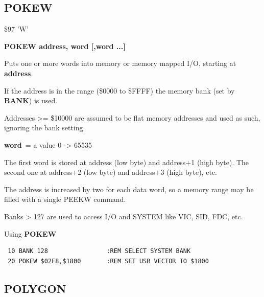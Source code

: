 \subsection{POKEW}
\begin{description}[leftmargin=2cm,style=nextline]
\item [Token:] \$97 'W'
\item [Format:] {\bf POKEW address, word [,word ...] }
\item [Usage:]  Puts one or more words into memory
                or memory mapped I/O, starting at
                {\bf address}.

                If the address is in the range (\$0000 to \$FFFF) the
                memory bank (set by {\bf BANK}) is used.

                Addresses >= \$10000 are assumed to be flat memory
                addresses and used as such, ignoring the bank setting.

                {\bf word} = a value 0 -> 65535

                The first word is stored at address (low byte)
                and address+1 (high byte). The second one at
                address+2 (low byte) and address+3 (high byte), etc.

\item [Remarks:] The address is increased by two for each data word,
                 so a memory range may be filled with a single PEEKW command.

                 Banks > 127 are used to access I/O and SYSTEM
                 like VIC, SID, FDC, etc.
\item [Example:] Using {\bf POKEW}

\begin{tcolorbox}[colback=black,coltext=white]
\verbatimfont{\codefont}
\begin{verbatim}
 10 BANK 128                :REM SELECT SYSTEM BANK
 20 POKEW $02F8,$1800       :REM SET USR VECTOR TO $1800
\end{verbatim}
\end{tcolorbox}
\end{description}


\newpage
\subsection{POLYGON}

